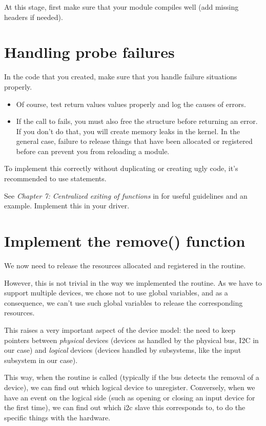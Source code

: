 At this stage, first make sure that your module compiles well (add
missing headers if needed).

\section{Handling probe failures}

In the code that you created, make sure that you handle failure
situations properly.

\begin{itemize}
\item Of course, test return values values properly and log 
      the causes of errors.
\item If the call to  fails,
      you must also free the  structure
      before returning an error. If you don't do that, you will create
      memory leaks in the kernel. In the general case, failure to
      release things that have been allocated or registered before
      can prevent you from reloading a module.
\end{itemize}

To implement this correctly without duplicating or creating ugly code,
it's recommended to use  statements.

See {\em Chapter 7: Centralized exiting of functions} in
 for useful guidelines and an example.
Implement this in your driver. 

\section{Implement the remove() function}

We now need to release the resources allocated and registered in the
 routine.

However, this is not trivial in the way we implemented the
 routine. As we have to support multiple devices, we chose
not to use global variables, and as a consequence, we can't use such
global variables to release the corresponding resources. 

This raises a very important aspect of the device model: the need to
keep pointers between {\em physical} devices (devices as handled by the
physical bus, I2C in our case) and {\em logical} devices (devices handled by subsystems,
like the input subsystem in our case).

This way, when the  routine is called (typically if the
bus detects the removal of a device), we can find out which logical
device to unregister. Conversely, when we have an event on the logical
side (such as opening or closing an input device for the first time),
we can find out which i2c slave this corresponds to, to do the specific
things with the hardware.  

